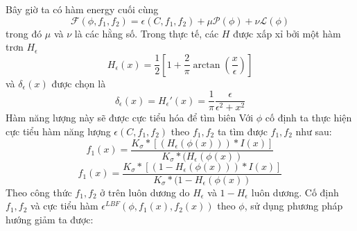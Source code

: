 \documentclass[14pt,oneside,a4paper]{extreport}
\begin{document}
Bây giờ ta có hàm energy cuối cùng
\begin{equation*}
\mathcal{F}(\phi,f_1,f_2)=\epsilon(C, f_1, f_2)+\mu \mathcal{P}(\phi)+\nu \mathcal{L}(\phi)
\end{equation*}
trong đó $\mu$ và $\nu$ là các hằng số. Trong thực tế, các $H$ được xấp xỉ bởi một hàm trơn $H_{\epsilon}$
\begin{equation*}
H_{\epsilon}(x)=\dfrac{1}{2}[1+\dfrac{2}{\pi}\arctan(\dfrac{x}{\epsilon})]
\end{equation*}
và $\delta_{\epsilon}(x)$ được chọn là
\begin{equation*}
\delta_{\epsilon}(x)=H_{\epsilon}'(x)=\dfrac{1}{\pi}\dfrac{\epsilon}{\epsilon^2+x^2}
\end{equation*}
Hàm năng lượng này sẽ được cực tiểu hóa để tìm biên 
Với $\phi$ cố định ta thực hiện cực tiểu hàm năng lượng $\epsilon(C, f_1, f_2)$  theo $f_1, f_2$ ta tìm được $f_1, f_2$ như sau:
\begin{equation}
f_1(x)=\dfrac{K_{\sigma}*[(H_{\epsilon}(\phi(x)))*I(x)]}{K_{\sigma}*(H_{\epsilon}(\phi(x))}
\end{equation}
\begin{equation}
f_1(x)=\dfrac{K_{\sigma}*[(1-H_{\epsilon}(\phi(x)))*I(x)]}{K_{\sigma}*(1-H_{\epsilon}(\phi(x))}
\end{equation}
Theo công thức $f_1, f_2$ ở trên luôn dương do $H_{\epsilon}$ và $1-H_{\epsilon}$ luôn dương. Cố định $f_1, f_2$ và cực tiểu hàm $\epsilon^{LBF}(\phi, f_1(x), f_2(x))$ theo $\phi$, sử dụng phương pháp hướng giảm ta được:
\end{document}
